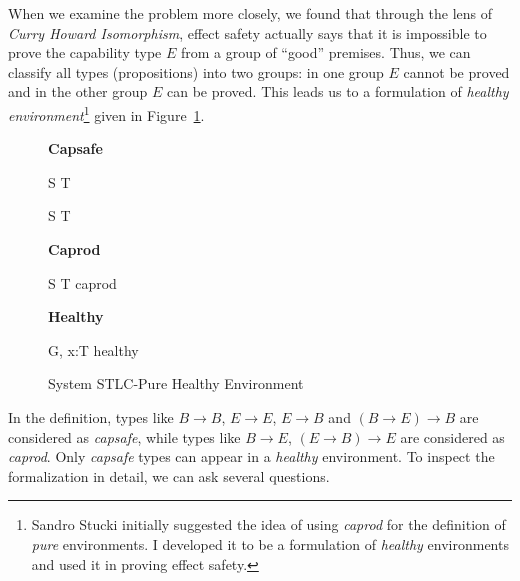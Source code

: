 When we examine the problem more closely, we found that through the
lens of \emph{Curry Howard Isomorphism}, effect safety actually says
that it is impossible to prove the capability type $E$ from a group of
``good'' premises. Thus, we can classify all types (propositions) into
two groups: in one group $E$ cannot be proved and in the other group
$E$ can be proved. This leads us to a formulation of \emph{healthy
  environment}\footnote{Sandro Stucki initially suggested the idea of
  using \emph{caprod} for the definition of \emph{pure}
  environments. I developed it to be a formulation of \emph{healthy}
  environments and used it in proving effect safety.} given in
Figure~\ref{fig:stlc-pure-healthy-definition}.

\begin{figure}[h]
\begin{framed}

\setlength{\columnseprule}{0.4pt}
\begin{multicols}{2}

\textbf{Capsafe}


{ S \to T \quad {} }

{ S \to T \quad {} }

\columnbreak

\textbf{Caprod}


{ S \to T \quad caprod }

\textbf{Healthy}


{ G, \; x:T \quad healthy }


\end{multicols}
\end{framed}

\caption{System STLC-Pure Healthy Environment}
\label{fig:stlc-pure-healthy-definition}
\end{figure}

In the definition, types like $B \to B$, $E \to E$, $E \to B$ and
$(B \to E) \to B$ are considered as \emph{capsafe}, while types like
$B \to E$, $(E \to B) \to E$ are considered as \emph{caprod}. Only
\emph{capsafe} types can appear in a \emph{healthy} environment. To
inspect the formalization in detail, we can ask several questions.

